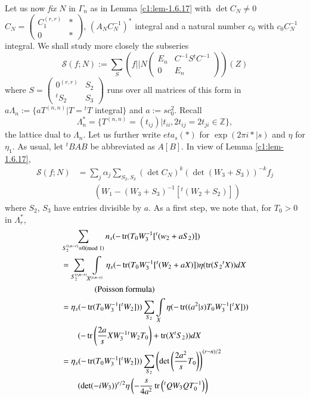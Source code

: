 Let us now {\em fix} $N$ in $\Gamma_{n}$ as in Lemma \ref{c1:lem-1.6.17}
with $\det C_{N}\neq 0$ $C_{N}=\left(\begin{smallmatrix} C_{1}^{(r,r)}
  & \ast\\ 0 & \ast\end{smallmatrix}\right)$,
  $(A_{N}C^{-1}_{N})^{\ast}$ integral and a natural number $c_{0}$
  with $c_{0}C^{-1}_{N}$ integral. We shall study more closely the
  subseries
$$
\mathscr{S}(f;N):=\sum_{S}(f||N
\begin{pmatrix}
E_{n} & C^{-1}S{}^{t}C^{-1}\\
0 & E_{n}
\end{pmatrix}
)(Z)
$$
where $S=\left(\begin{smallmatrix} 0^{(r,r)} & S_{2}\\ {}^{t}S_{2} &
  S_{3}
\end{smallmatrix}\right)$ runs over all matrices of this form in\pageoriginale
$a\Lambda_{n}:=\{aT^{(n,n)}|T={}^{t}T$ integral$\}$ and
$a:=sc^{2}_{0}$. Recall
$$
\Lambda^{\ast}_{n}=\{T^{(n,n)}=(t_{ij})|t_{ii},2t_{ij}=2t_{ji}\in
\mathbb{Z}\}, 
$$
the lattice dual to $\Lambda_{n}$. Let us further write $eta_{s}(\ast)$
for $\exp(2\pi i\ast|s)$ and $\eta$ for $\eta_{1}$. As usual, let
${}^{t}BAB$ be abbreviated as $A[B]$. In view of Lemma
\ref{c1:lem-1.6.17}, 
\begin{align*}
\mathscr{S} (f;N)&=\sum_{j}\alpha_{j}\sum_{S_{2},S_{3}}(\det C_{N})^{k}(\det
(W_{3}+S_{3}))^{-k}f_{j}\\
&\qquad(W_{1}-(W_{3}+S_{3})^{-1}[{}^{t}(W_{2}+S_{2})]) 
\end{align*}
where $S_{2}$, $S_{3}$ have entries divisible by $a$. As a first step,
we note that, for $T_{0}>0$ in $\Lambda^{\ast}_{r}$,
\begin{align*}
& \sum_{S^{(r,n-r)}_{2}\equiv 0(\rm{mod} \;
    1)}n_{s}(-\operatorname{tr}(T_{0}W^{-1}_{3}[{}^{t}(w_{2}+aS_{2})])\\
&=
  \sum_{S_{2}^{(r,n-r)}}\int\limits_{X^{(r,n-r)}}\eta_{s}(-\operatorname{tr}(T_{0}W^{-1}_{3}[{}^{t}(W_{2}+aX)])\eta(\operatorname{tr}(S_{2}{}^{t}X))dX\\
&\qquad\qquad\text{(Poisson formula)}\\
&=\eta_{s}(-\operatorname{tr}(T_{0}W^{-1}_{3}[{}^{t}W_{2}]))\sum_{S_{2}}\int\limits_{X}\eta(-\operatorname{tr}((a^{2}|s)T_{0}W^{-1}_{3}[{}^{t}X]))\\
&\qquad(-\operatorname{tr}\left(\frac{2a}{s}XW^{-1}_{3}{}^{t}W_{2}T_{0}\right)+\operatorname{tr}(X{}^{t}S_{2}))dX\\
&= \eta_{s}(-\operatorname{tr}(T_{0}W^{-1}_{3}[{}^{t}W_{2}]))\sum_{S_{2}}\left(\det
    \left(\frac{2a^{2}}{s}T_{0}\right)\right)^{(r-n)/2}\\
&\qquad(\det
    (-iW_{3}))^{r/2}\eta\left(-\frac{s}{4a^{2}}\operatorname{tr}\left({}^{t}QW_{3}QT^{-1}_{0}\right)\right) 
\end{align*}
